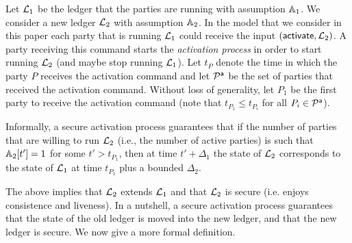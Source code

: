 Let $\mathcal{L}_1$ be the ledger that the parties are running with assumption $\mathbb{A}_1$. We consider a new ledger $\mathcal{L}_2$ with assumption $\mathbb{A}_2$.
In the model that we consider in this paper each party that is running $\mathcal{L}_1$ could receive the input $(\mathsf{activate}, \mathcal{L}_2)$. A party receiving this command starts the \emph{activation process}
in order to start running $\mathcal{L}_2$ (and maybe stop running $\mathcal{L}_1$). Let $t_P$ denote the time in which 
the party $P$ receives the activation command and let $\mathcal{P}^\mathsf{a}$ be the set of parties that received the activation command. Without loss of generality, let $P_1$ be the first party to receive the activation command (note that $t_{P_1}\leq t_{P_i}$ for all $P_i\in\mathcal{P}^\mathsf{a}$).

Informally, a secure activation process guarantees that if the number of parties that are willing to run $\mathcal{L}_2$ (i.e., the number of active parties)  
is such that $\mathbb{A}_2[t']=1$ for some $t'>t_{P_1}$, then at time $t'+\Delta_1$ the state of $\mathcal{L}_2$ corresponds to the state of $\mathcal{L}_1$ at time $t_{P_1}$ plus
a bounded $\Delta_2$.
 



The above implies that $\mathcal{L}_2$ extends $\mathcal{L}_1$ and that $\mathcal{L}_2$ is secure (i.e. enjoys consistence and liveness).
In a nutshell, a secure activation process guarantees that the state of the old ledger is moved into the new ledger, and that the new ledger is secure.
We now give a more formal definition.

